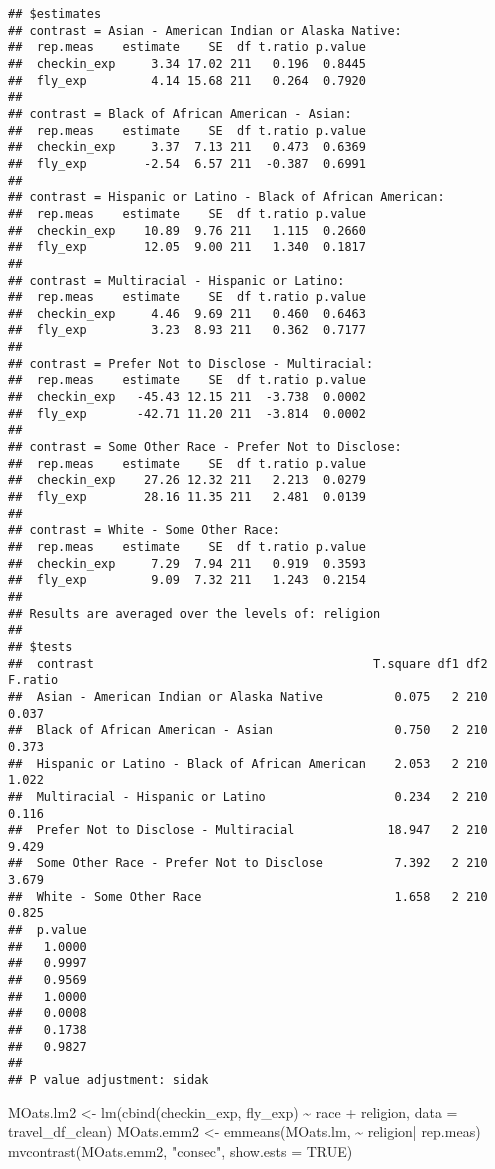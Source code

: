 \documentclass[
]{article}
\newenvironment{Shaded}{\begin{snugshade}}{\end{snugshade}}
\newcommand{\AttributeTok}[1]{\textcolor[rgb]{0.77,0.63,0.00}{#1}}
\newcommand{\ConstantTok}[1]{\textcolor[rgb]{0.00,0.00,0.00}{#1}}
\newcommand{\FunctionTok}[1]{\textcolor[rgb]{0.00,0.00,0.00}{#1}}
\newcommand{\NormalTok}[1]{#1}
\newcommand{\OtherTok}[1]{\textcolor[rgb]{0.56,0.35,0.01}{#1}}
\newcommand{\SpecialCharTok}[1]{\textcolor[rgb]{0.00,0.00,0.00}{#1}}
\newcommand{\StringTok}[1]{\textcolor[rgb]{0.31,0.60,0.02}{#1}}
\begin{document}
\begin{verbatim}
## $estimates
## contrast = Asian - American Indian or Alaska Native:
##  rep.meas    estimate    SE  df t.ratio p.value
##  checkin_exp     3.34 17.02 211   0.196  0.8445
##  fly_exp         4.14 15.68 211   0.264  0.7920
## 
## contrast = Black of African American - Asian:
##  rep.meas    estimate    SE  df t.ratio p.value
##  checkin_exp     3.37  7.13 211   0.473  0.6369
##  fly_exp        -2.54  6.57 211  -0.387  0.6991
## 
## contrast = Hispanic or Latino - Black of African American:
##  rep.meas    estimate    SE  df t.ratio p.value
##  checkin_exp    10.89  9.76 211   1.115  0.2660
##  fly_exp        12.05  9.00 211   1.340  0.1817
## 
## contrast = Multiracial - Hispanic or Latino:
##  rep.meas    estimate    SE  df t.ratio p.value
##  checkin_exp     4.46  9.69 211   0.460  0.6463
##  fly_exp         3.23  8.93 211   0.362  0.7177
## 
## contrast = Prefer Not to Disclose - Multiracial:
##  rep.meas    estimate    SE  df t.ratio p.value
##  checkin_exp   -45.43 12.15 211  -3.738  0.0002
##  fly_exp       -42.71 11.20 211  -3.814  0.0002
## 
## contrast = Some Other Race - Prefer Not to Disclose:
##  rep.meas    estimate    SE  df t.ratio p.value
##  checkin_exp    27.26 12.32 211   2.213  0.0279
##  fly_exp        28.16 11.35 211   2.481  0.0139
## 
## contrast = White - Some Other Race:
##  rep.meas    estimate    SE  df t.ratio p.value
##  checkin_exp     7.29  7.94 211   0.919  0.3593
##  fly_exp         9.09  7.32 211   1.243  0.2154
## 
## Results are averaged over the levels of: religion 
## 
## $tests
##  contrast                                       T.square df1 df2 F.ratio
##  Asian - American Indian or Alaska Native          0.075   2 210   0.037
##  Black of African American - Asian                 0.750   2 210   0.373
##  Hispanic or Latino - Black of African American    2.053   2 210   1.022
##  Multiracial - Hispanic or Latino                  0.234   2 210   0.116
##  Prefer Not to Disclose - Multiracial             18.947   2 210   9.429
##  Some Other Race - Prefer Not to Disclose          7.392   2 210   3.679
##  White - Some Other Race                           1.658   2 210   0.825
##  p.value
##   1.0000
##   0.9997
##   0.9569
##   1.0000
##   0.0008
##   0.1738
##   0.9827
## 
## P value adjustment: sidak
\end{verbatim}

\hfill\break

\begin{Shaded}
\begin{Highlighting}[]
\NormalTok{MOats.lm2 }\OtherTok{\textless{}{-}} \FunctionTok{lm}\NormalTok{(}\FunctionTok{cbind}\NormalTok{(checkin\_exp, fly\_exp) }\SpecialCharTok{\textasciitilde{}}\NormalTok{ race }\SpecialCharTok{+}\NormalTok{ religion, }\AttributeTok{data =}\NormalTok{ travel\_df\_clean)}
\NormalTok{MOats.emm2 }\OtherTok{\textless{}{-}} \FunctionTok{emmeans}\NormalTok{(MOats.lm, }\SpecialCharTok{\textasciitilde{}}\NormalTok{ religion}\SpecialCharTok{|}\NormalTok{ rep.meas)}
\FunctionTok{mvcontrast}\NormalTok{(MOats.emm2, }\StringTok{"consec"}\NormalTok{, }\AttributeTok{show.ests =} \ConstantTok{TRUE}\NormalTok{) }
\end{Highlighting}
\end{Shaded}
\end{document}
